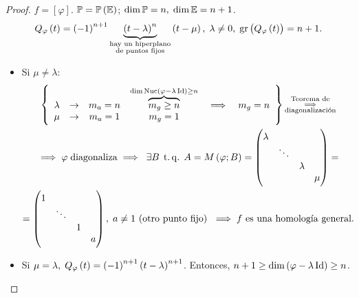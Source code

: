 \begin{proof}
    $f=\left[ \varphi \right]$. $\mathbb{P} = \mathbb{P} \left( \mathbb{E} \right)$; $\dim \mathbb{P} = n, \; \dim \mathbb{E} = n+1$.
    \[
        Q_{\varphi} \left( t \right) = \left( -1 \right) ^{n+1} \underbrace{\left( t-\lambda \right) ^{n}}_{\substack{\text{hay un hiperplano}\\ \text{de puntos fijos}}} \left( t-\mu \right), \; \lambda \neq 0, \; \operatorname{gr} \left( Q_{\varphi} \left( t \right) \right) = n+1.
    \]
    \begin{itemize}
        \item Si $\mu \neq \lambda$:
            \begin{gather*}
                \left\{
                \begin{array}{cccccc}
                    \lambda & \rightarrow & m_a=n & \overbrace{m_g \geq n}^{\dim \operatorname{Nuc} \left( \varphi - \lambda \operatorname{Id} \right) \geq n} & \implies & m_g=n \\
                    \mu & \rightarrow & m_a=1 & m_g = 1 & &  
                \end{array} \right\} \substack{\text{Teorema de} \\ \implies \\ \text{diagonalización}} \\
                \implies \varphi \; \text{diagonaliza} \implies \; \exists B \operatorname{\;t.q.\;} A=M \left( \varphi ; B \right) = 
                \begin{pmatrix}
                    \lambda & & & \\
                    & \ddots & & \\
                    & & \lambda & \\
                    & & & \mu
                \end{pmatrix} = \\
                = \begin{pmatrix}
                    1 & & & \\
                    & \ddots & & \\
                    & & 1 & \\
                    & & & a
                \end{pmatrix}, \; a\neq 1 \text{ (otro punto fijo) } \implies f \text{ es una homología general}.
            \end{gather*}
        \item Si $\mu = \lambda, \; Q_{\varphi} \left( t \right) = \left( -1 \right) ^{n+1} \left( t-\lambda \right)^{n+1}$. Entonces, 
        $n+1\geq \dim \left( \varphi - \lambda \operatorname{Id} \right) \geq n $.
        \begin{itemize}

\end{itemize}
\end{itemize}
\end{proof}
